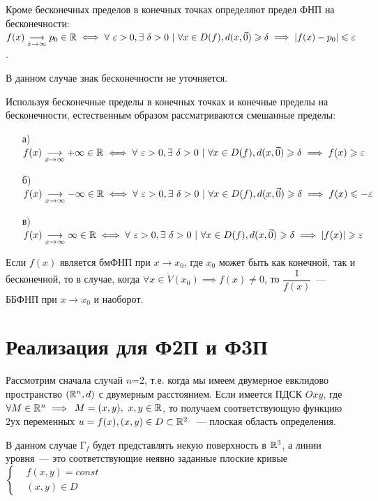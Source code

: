 \documentclass[../../main.tex]{subfiles}
\begin{document}
Кроме бесконечных пределов в конечных точках определяют предел ФНП
на бесконечности: $f(x)\underset{x \to \infty}{\longrightarrow}
p_0 \in \mathbb{R} \iff
\forall\ \varepsilon > 0, \exists\ \delta > 0\ |\
\forall x \in D(f), d(x, \vec{0}) \geqslant \delta
\implies |f(x) - p_0| \leqslant \varepsilon$.

В данном случае знак бесконечности не уточняется.

Используя бесконечные пределы в конечных точках и 
конечные пределы на бесконечности,
естественным образом рассматриваются смешанные пределы:

\begin{itemize}
	\item[а)] $f(x)\underset{x \to \infty}{\longrightarrow} +\infty \in \mathbb{R} \iff
	\forall\ \varepsilon > 0, \exists\ \delta > 0\ |\
	\forall x \in D(f), d(x, \vec{0}) \geqslant \delta
	\implies f(x) \geqslant \varepsilon$
	\item[б)] $f(x)\underset{x \to \infty}{\longrightarrow} -\infty \in \mathbb{R} \iff
	\forall\ \varepsilon > 0, \exists\ \delta > 0\ |\
	\forall x \in D(f), d(x, \vec{0}) \geqslant \delta
	\implies f(x) \leqslant -\varepsilon$
	\item[в)] $f(x)\underset{x \to \infty}{\longrightarrow} \infty \in \mathbb{R} \iff
	\forall\ \varepsilon > 0, \exists\ \delta > 0\ |\
	\forall x \in D(f), d(x, \vec{0}) \geqslant \delta
	\implies |f(x)| \geqslant \varepsilon$
\end{itemize}
	
Если $f(x)$ является бмФНП при $x \to x_0$, где $x_0$ может быть как конечной,
так и бесконечной, то в случае, когда $\forall x \in \dot{V}{(x_0)} \implies
f(x) \ne 0$, то $\dfrac{1}{f(x)}$~--- ББФНП при $x \to x_0$ и наоборот.
	
\section{Реализация для Ф2П и Ф3П}	

Рассмотрим сначала случай $n$=2, т.е. когда мы имеем двумерное евклидово
пространство $(\mathbb{R}^n, d)$ с двумерным расстоянием. Если имеется ПДСК $Oxy$, где
$\forall M \in \mathbb{R}^n \implies$
$M = (x, y),\ x, y \in \mathbb{R}$, то получаем
соответствующую функцию 2ух переменных 
$u = f(x), (x, y) \in D \subset \mathbb{R}^2$ ~---
плоская область определения.

В данном случае $\text{Г}_f$ будет представлять некую поверхность в $\mathbb{R}^3$,
а линии уровня~--- это соответствующие неявно заданные плоские кривые
$\left\{\begin{aligned}
	&f(x, y) = const \\
	&(x, y) \in D
\end{aligned}\right.$
\end{document}
